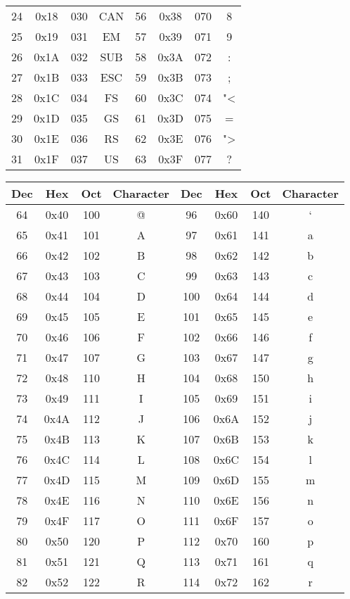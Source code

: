 \begin{tabular}{|c|c|c|c||c|c|c|c|}
24 & 0x18 & 030 & CAN & 56 & 0x38 & 070 & 8 \\
25 & 0x19 & 031 & EM & 57 & 0x39 & 071 & 9 \\
26 & 0x1A & 032 & SUB & 58 & 0x3A & 072 & : \\
27 & 0x1B & 033 & ESC & 59 & 0x3B & 073 & ; \\
28 & 0x1C & 034 & FS & 60 & 0x3C & 074 & "< \\
29 & 0x1D & 035 & GS & 61 & 0x3D & 075 & =\\
30 & 0x1E & 036 & RS & 62 & 0x3E & 076 & "> \\
31 & 0x1F & 037 & US & 63 & 0x3F & 077 & ? \\
\hline
\end{tabular}
\pagebreak

\begin{longtable}{|c|c|c|c||c|c|c|c|}
\hline
Dec & Hex & Oct & Character & Dec & Hex & Oct & Character\\
\hline
64 & 0x40 & 100 & @ & 96 & 0x60 & 140 & ` \\
65 & 0x41 & 101 & A & 97 & 0x61 & 141 & a \\
66 & 0x42 & 102 & B & 98 & 0x62 & 142 & b \\
67 & 0x43 & 103 & C & 99 & 0x63 & 143 & c \\
68 & 0x44 & 104 & D & 100 & 0x64 & 144 & d \\
69 & 0x45 & 105 & E & 101 & 0x65 & 145 & e \\
70 & 0x46 & 106 & F & 102 & 0x66 & 146 & f \\
71 & 0x47 & 107 & G & 103 & 0x67 & 147 & g \\
72 & 0x48 & 110 & H & 104 & 0x68 & 150 & h \\
73 & 0x49 & 111 & I & 105 & 0x69 & 151 & i \\
74 & 0x4A & 112 & J & 106 & 0x6A & 152 & j \\
75 & 0x4B & 113 & K & 107 & 0x6B & 153 & k \\
76 & 0x4C & 114 & L & 108 & 0x6C & 154 & l \\
77 & 0x4D & 115 & M & 109 & 0x6D & 155 & m \\
78 & 0x4E & 116 & N & 110 & 0x6E & 156 & n \\
79 & 0x4F & 117 & O & 111 & 0x6F & 157 & o \\
80 & 0x50 & 120 & P & 112 & 0x70 & 160 & p \\
81 & 0x51 & 121 & Q & 113 & 0x71 & 161 & q \\
82 & 0x52 & 122 & R & 114 & 0x72 & 162 & r \\

\end{longtable}
